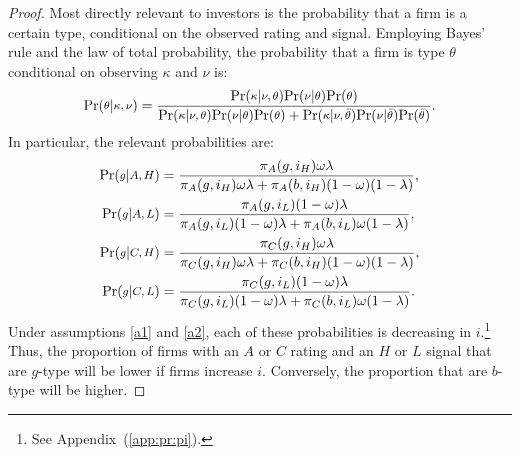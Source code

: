 \documentclass[notitlepage]{article}
\begin{document}
\begin{proof}
Most directly relevant to investors is the probability that a firm is a certain type, conditional on the observed rating and signal. Employing Bayes' rule and the law of total probability, the probability that a firm is type $\theta$ conditional on observing $\kappa$ and $\nu$ is:
\begin{equation*}
\textup{Pr}(\medmath{\theta}|\medmath{\kappa,\nu})=\frac{\textup{Pr}(\medmath{\kappa}|\medmath{\nu,\theta})\textup{Pr}(\medmath{\nu}|\medmath{\theta})\textup{Pr}(\medmath{\theta})}{\textup{Pr}(\medmath{\kappa}|\medmath{\nu,\theta})\textup{Pr}(\medmath{\nu}|\medmath{\theta})\textup{Pr}(\medmath{\theta})+\textup{Pr}(\medmath{\kappa}|\medmath{\nu,\bar{\theta}})\textup{Pr}(\medmath{\nu}|\medmath{\bar{\theta}})\textup{Pr}(\medmath{\bar{\theta}})}.
\end{equation*}
In particular, the relevant probabilities are:
\begin{align*}
\textup{Pr}(\medmath{g}|\medmath{A,H})&=%
\frac{\pi_{A}(g,i_{H})\omega\lambda}{\pi_{A}(g,i_{H})\omega\lambda+\pi_{A}(b,i_{H})(1-\omega)(1-\lambda)},\\
\textup{Pr}(\medmath{g}|\medmath{A,L})&=%
\frac{\pi_{A}(g,i_{L})(1-\omega)\lambda}{\pi_{A}(g,i_{L})(1-\omega)\lambda+\pi_{A}(b,i_{L})\omega(1-\lambda)},\\
\textup{Pr}(\medmath{g}|\medmath{C,H})&=%
\frac{\pi_{C}(g,i_{H})\omega\lambda}{\pi_{C}(g,i_{H})\omega\lambda+\pi_{C}(b,i_{H})(1-\omega)(1-\lambda)},\\
\textup{Pr}(\medmath{g}|\medmath{C,L})&=%
\frac{\pi_{C}(g,i_{L})(1-\omega)\lambda}{\pi_{C}(g,i_{L})(1-\omega)\lambda+\pi_{C}(b,i_{L})\omega(1-\lambda)}.
\end{align*}
Under assumptions \ref{a1} and \ref{a2}, each of these probabilities is decreasing in $i$.\footnote{See Appendix~(\ref{app:pr:pi}).} Thus, the proportion of firms with an $A$ or $C$ rating and an $H$ or $L$ signal that are $g$-type will be lower if firms increase $i$. Conversely, the proportion that are $b$-type will be higher.


\end{proof}
\end{document}
